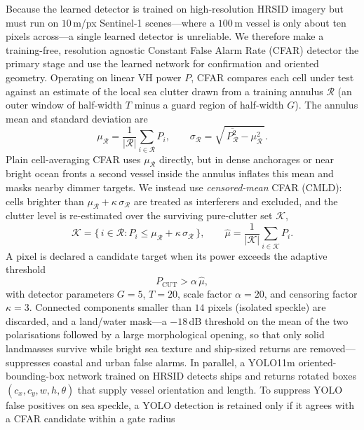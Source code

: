 \documentclass[a4paper,11pt]{article}
\begin{document}
Because the learned detector is trained on high-resolution HRSID imagery but must run on
$10$\,m/px Sentinel-1 scenes---where a $100$\,m vessel is only about ten pixels across---a
single learned detector is unreliable. We therefore make a training-free, resolution
agnostic Constant False Alarm Rate (CFAR) detector the primary stage and use the learned
network for confirmation and oriented geometry. Operating on linear VH power $P$, CFAR
compares each cell under test against an estimate of the local sea clutter drawn from a
training annulus $\mathcal{R}$ (an outer window of half-width $T$ minus a guard region of
half-width $G$). The annulus mean and standard deviation are
\begin{equation}
\mu_{\mathcal{R}} = \frac{1}{|\mathcal{R}|}\sum_{i\in\mathcal{R}} P_i,
\qquad
\sigma_{\mathcal{R}} = \sqrt{\,\overline{P^2_{\mathcal{R}}} - \mu_{\mathcal{R}}^2\,}.
\end{equation}
Plain cell-averaging CFAR uses $\mu_{\mathcal{R}}$ directly, but in dense anchorages or
near bright ocean fronts a second vessel inside the annulus inflates this mean and masks
nearby dimmer targets. We instead use \emph{censored-mean} CFAR (CMLD): cells brighter
than $\mu_{\mathcal{R}}+\kappa\,\sigma_{\mathcal{R}}$ are treated as interferers and
excluded, and the clutter level is re-estimated over the surviving pure-clutter set
$\mathcal{K}$,
\begin{equation}
\mathcal{K} = \{\,i\in\mathcal{R} : P_i \le \mu_{\mathcal{R}} + \kappa\,\sigma_{\mathcal{R}}\,\},
\qquad
\hat{\mu} = \frac{1}{|\mathcal{K}|}\sum_{i\in\mathcal{K}} P_i .
\end{equation}
A pixel is declared a candidate target when its power exceeds the adaptive threshold
\begin{equation}
P_{\text{CUT}} > \alpha\,\hat{\mu},
\end{equation}
with detector parameters $G=5$, $T=20$, scale factor $\alpha=20$, and censoring factor
$\kappa=3$. Connected components smaller than $14$ pixels (isolated speckle) are
discarded, and a land/water mask---a $-18$\,dB threshold on the mean of the two
polarisations followed by a large morphological opening, so that only solid landmasses
survive while bright sea texture and ship-sized returns are removed---suppresses coastal
and urban false alarms. In parallel, a YOLO11m oriented-bounding-box network
trained on HRSID detects ships and returns rotated boxes $(c_x,c_y,w,h,\theta)$ that
supply vessel orientation and length. To suppress YOLO false positives on sea speckle, a
YOLO detection is retained only if it agrees with a CFAR candidate within a gate radius
\end{document}

